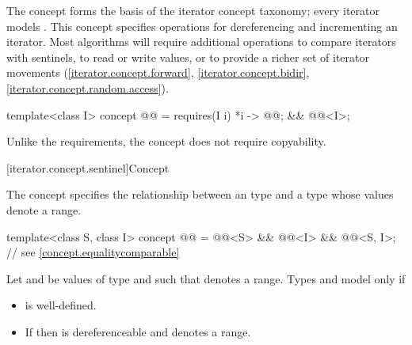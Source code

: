 \pnum
The  concept forms the basis
of the iterator concept taxonomy; every iterator models .
This concept specifies operations for dereferencing and incrementing
an iterator. Most algorithms will require additional operations
to compare iterators with sentinels, to
read or write values, or
to provide a richer set of iterator movements (\ref{iterator.concept.forward},
\ref{iterator.concept.bidir}, \ref{iterator.concept.random.access}).

\begin{codeblock}
template<class I>
  concept @@ =
    requires(I i) {
      { *i } -> @@;
    } &&
    @@<I>;
\end{codeblock}

\pnum
\begin{note}
Unlike the  requirements,
the  concept does not require copyability.
\end{note}

[iterator.concept.sentinel]{Concept }

\pnum
The  concept specifies the relationship
between an  type and a  type
whose values denote a range.

\begin{itemdecl}
template<class S, class I>
  concept @@ =
    @@<S> &&
    @@<I> &&
    @@<S, I>;      // see \ref{concept.equalitycomparable}
\end{itemdecl}

\begin{itemdescr}
\pnum
Let  and  be values of type  and
 such that  denotes a range. Types
 and  model  only if
\begin{itemize}
\item {} is well-defined.

\item If  then  is dereferenceable and
       denotes a range.
\end{itemize}
\end{itemdescr}

